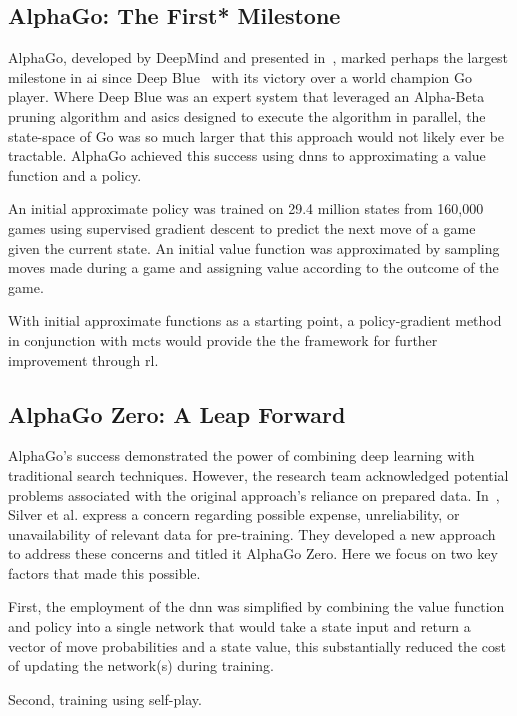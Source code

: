 \subsection*{AlphaGo: The First* Milestone}
AlphaGo, developed by DeepMind and presented in~\cite{silver2016}, 
marked perhaps the largest milestone in \gls{ai} since Deep Blue~\cite{campbell2002}
with its victory over a world champion Go player.
Where Deep Blue was an expert system that leveraged an Alpha-Beta pruning algorithm
and \glspl{asic} designed to execute the algorithm in parallel,
the state-space of Go was so much larger that this approach would not likely ever be tractable. 
AlphaGo achieved this success using \glspl{dnn} to approximating a value function and a policy.

An initial approximate policy was trained on 29.4 million states from 160,000 games
using supervised gradient descent to predict the next move of a game given the current state.
An initial value function was approximated by sampling moves made during a game
and assigning value according to the outcome of the game.

With initial approximate functions as a starting point,
a policy-gradient method in conjunction with \gls{mcts}
would provide the the framework for further improvement through \gls{rl}.

\subsection*{AlphaGo Zero: A Leap Forward}
AlphaGo's success demonstrated the power of combining deep learning with traditional 
search techniques. However, the research team acknowledged potential problems associated with 
the original approach's reliance on prepared data. 
In~\cite{silver2017}, Silver et al. express a concern regarding 
possible expense, unreliability, or unavailability of relevant data for pre-training.
They developed a new approach to address these concerns and titled it AlphaGo Zero.
Here we focus on two key factors that made this possible.




First,
the employment of the \gls{dnn}
was simplified by combining the value function and policy into a single network 
that would take a state input and return a vector of move probabilities and a state value,
this substantially reduced the cost of updating the network(s) during training.

Second,
training using self-play.




